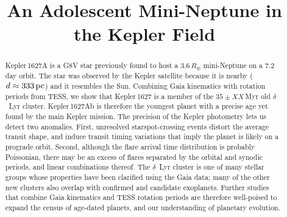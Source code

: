 \documentclass[12pt,modern,twocolumn,tighten]{aastex63}
\newcommand{\pn}{Kepler\,1627Ab} %
\begin{document}
\title{
  An Adolescent Mini-Neptune in the Kepler Field
}




\begin{abstract}
  Kepler\,1627A is a G8V star previously found to host a
  $3.6\,R_\oplus$ mini-Neptune on a 7.2\,day orbit.  The star was
  observed by the Kepler satellite because it is nearby ($d\approx
  333\,{\rm pc}$) and it resembles the Sun.  Combining Gaia kinematics
  with rotation periods from TESS, we show that Kepler\,1627 is a
  member of the $35\pm XX$\,Myr old $\delta$~Lyr cluster.
  Kepler\,1627Ab is therefore the youngest planet with a precise age
  yet found by the main Kepler mission.  The precision of the Kepler
  photometry lets us detect two anomalies.  First, unresolved
  starspot-crossing events distort the average transit shape, and
  induce transit timing variations that imply the planet is likely on
  a prograde orbit.  Second, although the flare arrival time
  distribution is probably Poissonian, there may be an excess of
  flares separated by the orbital and synodic periods, and linear
  combinations thereof.  The $\delta$~Lyr cluster is one of many
  stellar groups whose properties have been clarified using the Gaia
  data; many of the other new clusters also overlap with confirmed and
  candidate exoplanets.  Further studies that combine Gaia kinematics
  and TESS rotation periods are therefore well-poised to expand the
  census of age-dated planets, and our understanding of planetary
  evolution.
\end{abstract}
\end{document}
